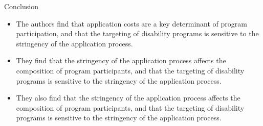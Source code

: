 \documentclass{beamer}
\begin{document}
\begin{frame}{Conclusion}
    \begin{itemize}
        \item The authors find that application costs are a key determinant of program participation, and that the targeting of disability programs is sensitive to the stringency of the application process.
        \item They find that the stringency of the application process affects the composition of program participants, and that the targeting of disability programs is sensitive to the stringency of the application process.
        \item They also find that the stringency of the application process affects the composition of program participants, and that the targeting of disability programs is sensitive to the stringency of the application process.
    \end{itemize}
\end{frame}
    
\end{document}
